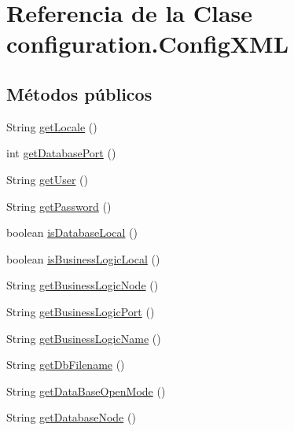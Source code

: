 \hypertarget{classconfiguration_1_1ConfigXML}{}\section{Referencia de la Clase configuration.\+Config\+X\+ML}
\label{classconfiguration_1_1ConfigXML}
\subsection*{Métodos públicos}
\begin{DoxyCompactItemize}
\item 
String \mbox{\hyperlink{classconfiguration_1_1ConfigXML_a6b861b18eba822ef3a5130a1c3f410b2}{get\+Locale}} ()
\item 
int \mbox{\hyperlink{classconfiguration_1_1ConfigXML_abf4649caafdcfb0b506af7402f09728c}{get\+Database\+Port}} ()
\item 
String \mbox{\hyperlink{classconfiguration_1_1ConfigXML_a98e53bd841ca5f520af914f96ff2afef}{get\+User}} ()
\item 
String \mbox{\hyperlink{classconfiguration_1_1ConfigXML_a70146fb5f8cda65220413959691e3616}{get\+Password}} ()
\item 
boolean \mbox{\hyperlink{classconfiguration_1_1ConfigXML_a2ee9afbde36aa3f5c0d0158a8b5449fb}{is\+Database\+Local}} ()
\item 
boolean \mbox{\hyperlink{classconfiguration_1_1ConfigXML_a3055cd4f61151ef6d1c48a5ebf86b33f}{is\+Business\+Logic\+Local}} ()
\item 
String \mbox{\hyperlink{classconfiguration_1_1ConfigXML_a6a79b28dd9e0c1c755fef0e7435ec03a}{get\+Business\+Logic\+Node}} ()
\item 
String \mbox{\hyperlink{classconfiguration_1_1ConfigXML_a7e8cb431bc1e899176ae2891c007f7f3}{get\+Business\+Logic\+Port}} ()
\item 
String \mbox{\hyperlink{classconfiguration_1_1ConfigXML_ad6866b6aee38c74c082135f5dcd743ad}{get\+Business\+Logic\+Name}} ()
\item 
String \mbox{\hyperlink{classconfiguration_1_1ConfigXML_a403cc4242d937a87dfea24caabaf535d}{get\+Db\+Filename}} ()
\item 
String \mbox{\hyperlink{classconfiguration_1_1ConfigXML_a693787d7818204c9188cb0c03d9423a0}{get\+Data\+Base\+Open\+Mode}} ()
\item 
String \mbox{\hyperlink{classconfiguration_1_1ConfigXML_a622fdcb9a55b406b6bc2fa63509dae72}{get\+Database\+Node}} ()
\end{DoxyCompactItemize}
